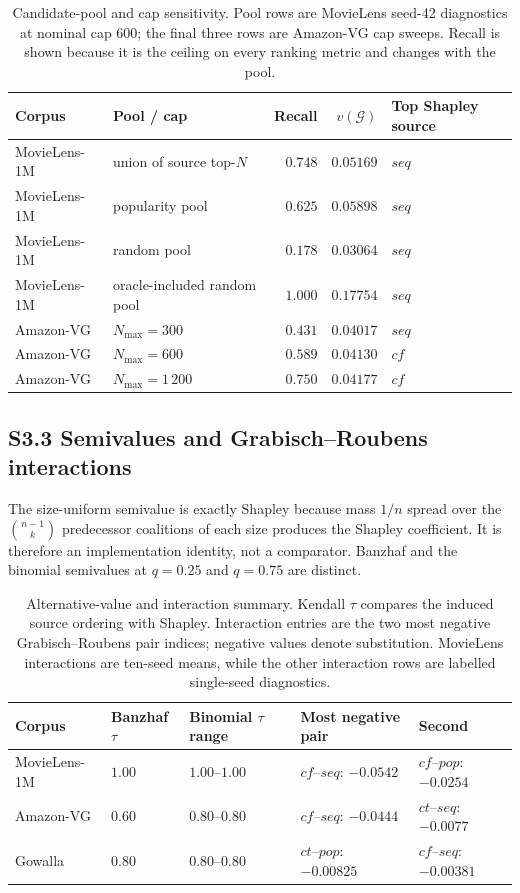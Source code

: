 \documentclass[10pt]{article}
\newcommand{\G}{\mathcal{G}}
\begin{document}
\begin{table}[H]
\centering
\small
\caption{Candidate-pool and cap sensitivity. Pool rows are MovieLens seed-42
diagnostics at nominal cap 600; the final three rows are Amazon-VG cap sweeps.
Recall is shown because it is the ceiling on every ranking metric and changes
with the pool.}
\label{tab:pools}
\begin{tabular}{@{}llrrl@{}}
\toprule
Corpus & Pool / cap & Recall & $v(\G)$ & Top Shapley source \\
\midrule
MovieLens-1M & union of source top-$N$ & $0.748$ & $0.05169$ & $seq$ \\
MovieLens-1M & popularity pool & $0.625$ & $0.05898$ & $seq$ \\
MovieLens-1M & random pool & $0.178$ & $0.03064$ & $seq$ \\
MovieLens-1M & oracle-included random pool & $1.000$ & $0.17754$ & $seq$ \\
\midrule
Amazon-VG & $N_{\max}=300$ & $0.431$ & $0.04017$ & $seq$ \\
Amazon-VG & $N_{\max}=600$ & $0.589$ & $0.04130$ & $cf$ \\
Amazon-VG & $N_{\max}=1\,200$ & $0.750$ & $0.04177$ & $cf$ \\
\bottomrule
\end{tabular}
\end{table}

\subsection*{S3.3 Semivalues and Grabisch--Roubens interactions}

The size-uniform semivalue is exactly Shapley because mass $1/n$ spread over
the $\binom{n-1}{k}$ predecessor coalitions of each size produces the Shapley
coefficient. It is therefore an implementation identity, not a comparator.
Banzhaf and the binomial semivalues at $q=0.25$ and $q=0.75$ are distinct.

\begin{table}[H]
\centering
\small
\caption{Alternative-value and interaction summary. Kendall $\tau$ compares
the induced source ordering with Shapley. Interaction entries are the two most
negative Grabisch--Roubens pair indices; negative values denote substitution.
MovieLens interactions are ten-seed means, while the other interaction rows
are labelled single-seed diagnostics.}
\label{tab:semivalues}
\begin{tabular}{@{}lllll@{}}
\toprule
Corpus & Banzhaf $\tau$ & Binomial $\tau$ range & Most negative pair & Second \\
\midrule
MovieLens-1M & $1.00$ & $1.00$--$1.00$ & $cf$--$seq$: $-0.0542$ & $cf$--$pop$: $-0.0254$ \\
Amazon-VG & $0.60$ & $0.80$--$0.80$ & $cf$--$seq$: $-0.0444$ & $ct$--$seq$: $-0.0077$ \\
Gowalla & $0.80$ & $0.80$--$0.80$ & $ct$--$pop$: $-0.00825$ & $cf$--$seq$: $-0.00381$ \\
\bottomrule
\end{tabular}
\end{table}
\end{document}
